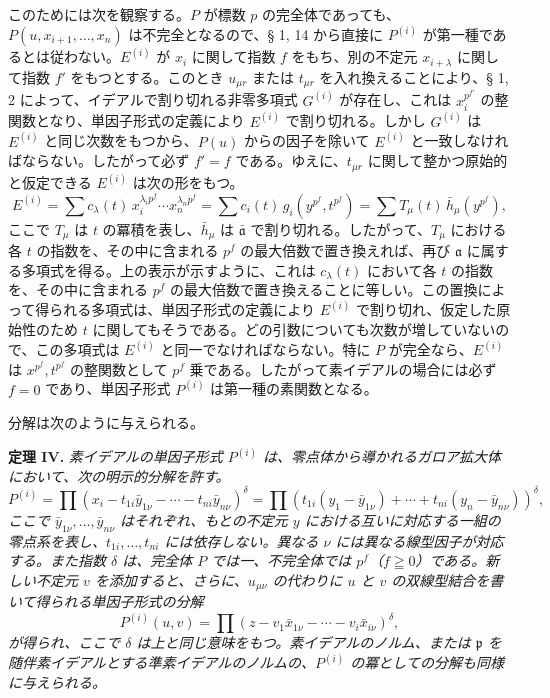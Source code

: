 \documentclass[11pt]{article}
\providecommand{\frakp}{\mathfrak p}
\providecommand{\fraka}{\mathfrak a}
\providecommand{\frakp}{\mathfrak p}
\begin{document}
このためには次を観察する。$P$ が標数 $p$ の完全体であっても、$P(u,x_{i+1},\ldots,x_n)$ は不完全となるので、§ 1, 14 から直接に $P^{(i)}$ が第一種であるとは従わない。$E^{(i)}$ が $x_i$ に関して指数 $f$ をもち、別の不定元 $x_{i+\lambda}$ に関して指数 $f'$ をもつとする。このとき $u_{\mu r}$ または $t_{\mu r}$ を入れ換えることにより、§ 1, 2 によって、イデアルで割り切れる非零多項式 $G^{(i)}$ が存在し、これは $x_i^{p^{f'}}$ の整関数となり、単因子形式の定義により $E^{(i)}$ で割り切れる。しかし $G^{(i)}$ は $E^{(i)}$ と同じ次数をもつから、$P(u)$ からの因子を除いて $E^{(i)}$ と一致しなければならない。したがって必ず $f'=f$ である。ゆえに、$t_{\mu r}$ に関して整かつ原始的と仮定できる $E^{(i)}$ は次の形をもつ。
\[
 E^{(i)}=\sum c_\lambda(t)\,x_i^{\lambda_i p^f}\cdots x_n^{\lambda_n p^f}
       =\sum c_i(t)\,g_i(y^{p^f},t^{p^f})
       =\sum T_\mu(t)\,\bar h_\mu(y^{p^f}),
\]
ここで $T_\mu$ は $t$ の冪積を表し、$\bar h_\mu$ は $\bar{\fraka}$ で割り切れる。したがって、$T_\mu$ における各 $t$ の指数を、その中に含まれる $p^f$ の最大倍数で置き換えれば、再び $\fraka$ に属する多項式を得る。上の表示が示すように、これは $c_\lambda(t)$ において各 $t$ の指数を、その中に含まれる $p^f$ の最大倍数で置き換えることに等しい。この置換によって得られる多項式は、単因子形式の定義により $E^{(i)}$ で割り切れ、仮定した原始性のため $t$ に関してもそうである。どの引数についても次数が増していないので、この多項式は $E^{(i)}$ と同一でなければならない。特に $P$ が完全なら、$E^{(i)}$ は $x^{p^f},t^{p^f}$ の整関数として $p^f$ 乗である。したがって素イデアルの場合には必ず $f=0$ であり、単因子形式 $P^{(i)}$ は第一種の素関数となる。

分解は次のように与えられる。

\textbf{定理 IV.} \emph{素イデアルの単因子形式 $P^{(i)}$ は、零点体から導かれるガロア拡大体において、次の明示的分解を許す。}
\[
 P^{(i)}=\prod (x_i-t_{1i}\bar y_{1\nu}-\cdots-t_{ni}\bar y_{n\nu})^\delta
 =\prod (t_{1i}(y_1-\bar y_{1\nu})+\cdots+t_{ni}(y_n-\bar y_{n\nu}))^\delta,
\]
\emph{ここで $\bar y_{1\nu},\ldots,\bar y_{n\nu}$ はそれぞれ、もとの不定元 $y$ における互いに対応する一組の零点系を表し、$t_{1i},\ldots,t_{ni}$ には依存しない。異なる $\nu$ には異なる線型因子が対応する。また指数 $\delta$ は、完全体 $P$ では一、不完全体では $p^f$（$f\geqq0$）である。新しい不定元 $v$ を添加すると、さらに、$u_{\mu\nu}$ の代わりに $u$ と $v$ の双線型結合を書いて得られる単因子形式の分解}
\[
 P^{(i)}(u,v)=\prod (z-v_1\bar x_{1\nu}-\cdots-v_i\bar x_{i\nu})^\delta,
\]
\emph{が得られ、ここで $\delta$ は上と同じ意味をもつ。素イデアルのノルム、または $\frakp$ を随伴素イデアルとする準素イデアルのノルムの、$P^{(i)}$ の冪としての分解も同様に与えられる。}
\end{document}
